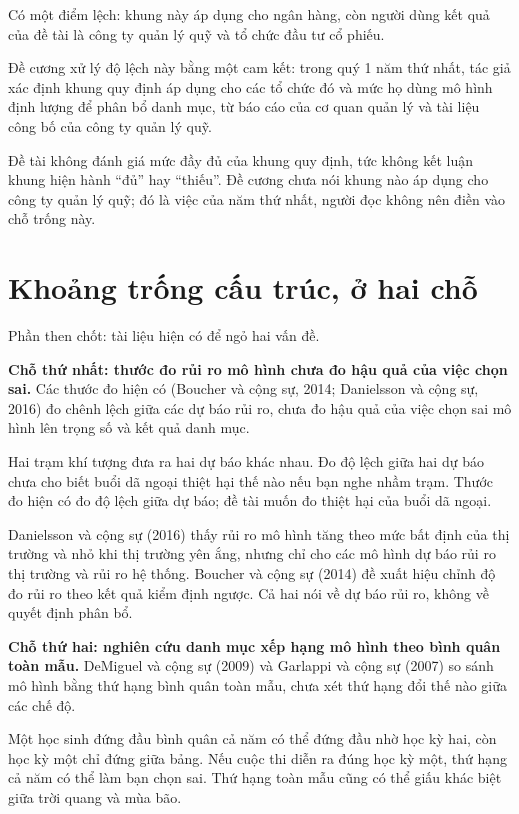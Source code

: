 Có một điểm lệch: khung này áp dụng cho ngân hàng, còn người dùng kết quả của đề tài là công ty quản lý quỹ và tổ chức đầu tư cổ phiếu.

Đề cương xử lý độ lệch này bằng một cam kết: trong quý 1 năm thứ nhất, tác giả xác định khung quy định áp dụng cho các tổ chức đó và mức họ dùng mô hình định lượng để phân bổ danh mục, từ báo cáo của cơ quan quản lý và tài liệu công bố của công ty quản lý quỹ.

Đề tài không đánh giá mức đầy đủ của khung quy định, tức không kết luận khung hiện hành “đủ” hay “thiếu”. Đề cương chưa nói khung nào áp dụng cho công ty quản lý quỹ; đó là việc của năm thứ nhất, người đọc không nên điền vào chỗ trống này.

\section{Khoảng trống cấu trúc, ở hai chỗ}

Phần then chốt: tài liệu hiện có để ngỏ hai vấn đề.

\textbf{Chỗ thứ nhất: thước đo rủi ro mô hình chưa đo hậu quả của việc chọn sai.} Các thước đo hiện có (Boucher và cộng sự, 2014; Danielsson và cộng sự, 2016) đo chênh lệch giữa các dự báo rủi ro, chưa đo hậu quả của việc chọn sai mô hình lên trọng số và kết quả danh mục.

Hai trạm khí tượng đưa ra hai dự báo khác nhau. Đo độ lệch giữa hai dự báo chưa cho biết buổi dã ngoại thiệt hại thế nào nếu bạn nghe nhầm trạm. Thước đo hiện có đo độ lệch giữa dự báo; đề tài muốn đo thiệt hại của buổi dã ngoại.

Danielsson và cộng sự (2016) thấy rủi ro mô hình tăng theo mức bất định của thị trường và nhỏ khi thị trường yên ắng, nhưng chỉ cho các mô hình dự báo rủi ro thị trường và rủi ro hệ thống. Boucher và cộng sự (2014) đề xuất hiệu chỉnh độ đo rủi ro theo kết quả kiểm định ngược. Cả hai nói về dự báo rủi ro, không về quyết định phân bổ.

\textbf{Chỗ thứ hai: nghiên cứu danh mục xếp hạng mô hình theo bình quân toàn mẫu.} DeMiguel và cộng sự (2009) và Garlappi và cộng sự (2007) so sánh mô hình bằng thứ hạng bình quân toàn mẫu, chưa xét thứ hạng đổi thế nào giữa các chế độ.

Một học sinh đứng đầu bình quân cả năm có thể đứng đầu nhờ học kỳ hai, còn học kỳ một chỉ đứng giữa bảng. Nếu cuộc thi diễn ra đúng học kỳ một, thứ hạng cả năm có thể làm bạn chọn sai. Thứ hạng toàn mẫu cũng có thể giấu khác biệt giữa trời quang và mùa bão.


